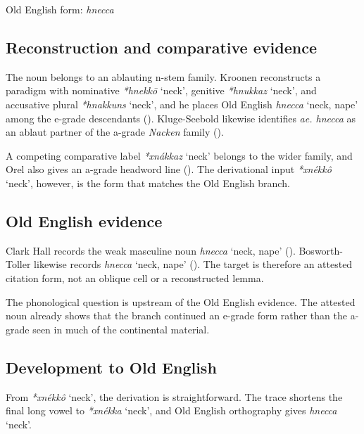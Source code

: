 \documentclass[
  british,
  a4paper,
  openany]{book}
\providecommand{\Recon}[1]{\emph{*#1}}
{\catcode`→=\active \global\def→{\ensuremath{\rightarrow}}}
\providecommand{\Recon}[1]{\emph{*#1}}
{\catcode`→=\active \global\def→{\ensuremath{\rightarrow}}}
\begin{document}
Old English form: \emph{hnecca}

\subsection{Reconstruction and comparative
evidence}\label{reconstruction-and-comparative-evidence-90}

The noun belongs to an ablauting n-stem family. Kroonen reconstructs a
paradigm with nominative \Recon{hnekkō} `neck', genitive \Recon{hnukkaz}
`neck', and accusative plural \Recon{hnakkuns} `neck', and he places Old
English {\emph{hnecca}} `neck, nape' among the e-grade descendants
(). Kluge-Seebold likewise
identifies \emph{ae. hnecca} as an ablaut partner of the a-grade
\emph{Nacken} family ().

A competing comparative label {\Recon{xnákkaz} `neck'} belongs to the
wider family, and Orel also gives an a-grade headword line
(). The derivational input
{\Recon{xnékkô} `neck'}, however, is the form that matches the Old
English branch.

\subsection{Old English evidence}\label{old-english-evidence-90}

Clark Hall records the weak masculine noun {\emph{hnecca}} `neck, nape'
(). Bosworth-Toller
likewise records {\emph{hnecca}} `neck, nape'
(). The
target is therefore an attested citation form, not an oblique cell or a
reconstructed lemma.

The phonological question is upstream of the Old English evidence. The
attested noun already shows that the branch continued an e-grade form
rather than the a-grade seen in much of the continental material.

\subsection{Development to Old
English}\label{development-to-old-english-90}

From {\Recon{xnékkô} `neck'}, the derivation is straightforward. The
trace shortens the final long vowel to \Recon{xnékka} `neck', and Old
English orthography gives {\emph{hnecca}} `neck'.
\end{document}
